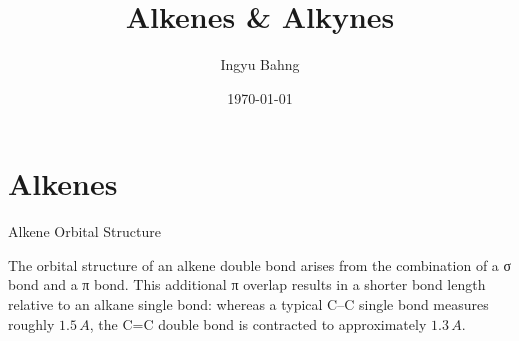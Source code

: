 \documentclass[10pt]{article}
\title{Alkenes \& Alkynes}
\date{\today}
\author{Ingyu Bahng}
\begin{document}


\section{Alkenes}
  \label{sec:alkenes}

  \begin{core}[label=core:alkene_orbital]{Alkene Orbital Structure}

    The orbital structure of an alkene double bond arises from the combination of a σ bond and a π bond. This additional π overlap results in a shorter bond length relative to an alkane single bond: whereas a typical C--C single bond measures roughly $1.5\,A$, the C=C double bond is contracted to approximately $1.3\,A$.


  \end{core}
\end{document}
